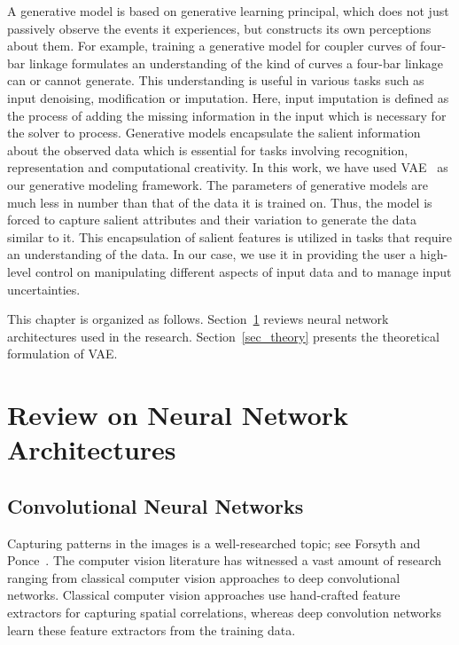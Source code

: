 A generative model is based on generative learning principal, which does not just passively observe the events it experiences, but constructs its own perceptions about them.
For example, training a generative model for coupler curves of four-bar linkage formulates an understanding of the kind of curves a four-bar linkage can or cannot generate.
This understanding is useful in various tasks such as input denoising, modification or imputation.
Here, input imputation is defined as the process of adding the missing information in the input which is necessary for the solver to process.
Generative models encapsulate the salient information about the observed data which is essential for tasks involving recognition, representation and computational creativity.
In this work, we have used VAE~\cite{Kingma2014AutoEncodingVB} as our generative modeling framework.
The parameters of generative models are much less in number than that of the data it is trained on.
Thus, the model is forced to capture salient attributes and their variation to generate the data similar to it.
This encapsulation of salient features is utilized in tasks that require an understanding of the data.
In our case, we use it in providing the user a high-level control on manipulating different aspects of input data and to manage input uncertainties.
  
This chapter is organized as follows.
Section~\ref{sec_arch} reviews neural network architectures used in the research.
Section~\ref{sec_theory} presents the theoretical formulation of VAE.


\section{Review on Neural Network Architectures}\label{sec_arch}

\subsection{Convolutional Neural Networks}\label{subsec_deepconv}
Capturing patterns in the images is a well-researched topic; see Forsyth and Ponce~\cite{forsyth2002computer}. The computer vision literature has witnessed a vast amount of research ranging from classical computer vision approaches to deep convolutional networks. Classical computer vision approaches use hand-crafted feature extractors for capturing spatial correlations, whereas deep convolution networks learn these feature extractors from the training data.  


